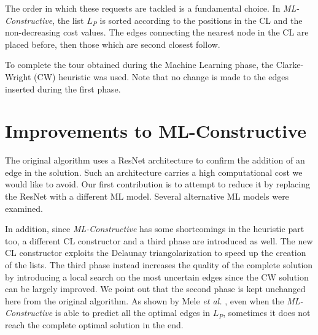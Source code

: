 \documentclass{article}
\begin{document}
The order in which these requests are tackled is a fundamental choice.
In \emph{ML-Constructive}, the list $L_P$ is sorted according to the positions in the CL and the non-decreasing cost values.
The edges connecting the nearest node in the CL are placed before, then those which are second closest follow.

\vspace{5 pt}

To complete the tour obtained during the Machine Learning phase, the Clarke-Wright (CW) heuristic \cite{clarke:wright} was used. 
Note that no change is made to the edges inserted during the first phase.

\newpage

\section{Improvements to ML-Constructive} \label{improvements}

The original algorithm uses a ResNet architecture \cite{resnet} to confirm the addition of an edge in the solution.
Such an architecture carries a high computational cost we would like to avoid.
Our first contribution is to attempt to reduce it by replacing the ResNet with a different ML model.
Several alternative ML models were examined.

\vspace{5 pt}

In addition, since \emph{ML-Constructive} has some shortcomings in the heuristic part too, a different CL constructor and a third phase are introduced as well.
The new CL constructor exploits the Delaunay triangolarization \cite{delaunay} to speed up the creation of the lists.
The third phase instead increases the quality of the complete solution by introducing a local search on the most uncertain edges since the CW solution can be largely improved.
We point out that the second phase is kept unchanged here from the original algorithm.
As shown by Mele \emph{et al.} \cite{mele:gambardella:montemanni}, even when the \emph{ML-Constructive} is able to predict all the optimal edges in $L_P$, sometimes it does not reach the complete optimal solution in the end.
\end{document}
